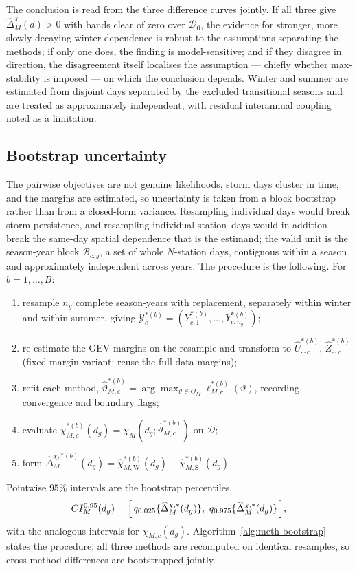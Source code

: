 The conclusion is read from the three difference curves jointly. If all three give \(\widehat\Delta_M^{\chi}(d)>0\) with bands clear of zero over \(\mathcal D_0\), the evidence for stronger, more slowly decaying winter dependence is robust to the assumptions separating the methods; if only one does, the finding is model-sensitive; and if they disagree in direction, the disagreement itself localises the assumption --- chiefly whether max-stability is imposed --- on which the conclusion depends. Winter and summer are estimated from disjoint days separated by the excluded transitional seasons and are treated as approximately independent, with residual interannual coupling noted as a limitation.

\subsection{Bootstrap uncertainty}\label{sec:meth-inference}

The pairwise objectives are not genuine likelihoods, storm days cluster in time, and the margins are estimated, so uncertainty is taken from a block bootstrap rather than from a closed-form variance. Resampling individual days would break storm persistence, and resampling individual station--days would in addition break the same-day spatial dependence that is the estimand; the valid unit is the season-year block \(\mathcal B_{c,y}\), a set of whole \(N\)-station days, contiguous within a season and approximately independent across years. The procedure is the following. For \(b=1,\dots,B\):
\begin{enumerate}\setlength{\itemsep}{1pt}
  \item resample \(n_y\) complete season-years with replacement, separately within winter and within summer, giving \(\mathcal Y^{*(b)}_c=(Y^{*(b)}_{c,1},\dots,Y^{*(b)}_{c,n_y})\);
  \item re-estimate the GEV margins on the resample and transform to \(\widehat U^{*(b)}_{\cdot\cdot c}\), \(\widehat Z^{*(b)}_{\cdot\cdot c}\) (fixed-margin variant: reuse the full-data margins);
  \item refit each method, \(\widehat\vartheta^{*(b)}_{M,c}=\arg\max_{\vartheta\in\Theta_M}\ell^{*(b)}_{M,c}(\vartheta)\), recording convergence and boundary flags;
  \item evaluate \(\widehat\chi^{*(b)}_{M,c}(d_g)=\chi_M(d_g;\widehat\vartheta^{*(b)}_{M,c})\) on \(\mathcal D\);
  \item form \(\widehat\Delta^{\chi,*(b)}_M(d_g)=\widehat\chi^{*(b)}_{M,\mathrm W}(d_g)-\widehat\chi^{*(b)}_{M,\mathrm S}(d_g)\).
\end{enumerate}
Pointwise \(95\%\) intervals are the bootstrap percentiles,
\begin{equation}
  CI^{0.95}_M(d_g)=\Bigl[\,q_{0.025}\{\widehat\Delta^{\chi,*}_M(d_g)\},\ q_{0.975}\{\widehat\Delta^{\chi,*}_M(d_g)\}\,\Bigr],
\end{equation}
with the analogous intervals for \(\chi_{M,c}(d_g)\). Algorithm~\ref{alg:meth-bootstrap} states the procedure; all three methods are recomputed on identical resamples, so cross-method differences are bootstrapped jointly.

